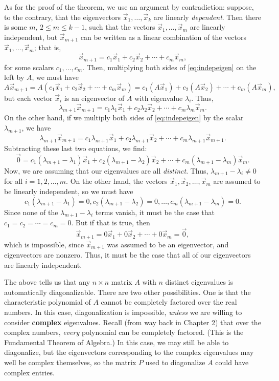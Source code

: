 As for the proof of the theorem, we use an argument by contradiction: suppose, to the contrary, that the eigenvectors $\vec{x}_1, \ldots, \vec{x}_k$ are linearly \textit{dependent}. Then there is some $m$, $2\leq m\leq k-1$, such that the vectors $\vec{x}_1, \ldots, \vec{x}_m$ are linearly independent, but $\vec{x}_{m+1}$ can be written as a linear combination of the vectors $\vec{x}_1, \ldots, \vec{x}_m$; that is,
\begin{equation}\label{eq:indepeigen}
 \vec{x}_{m+1} = c_1\vec{x}_1+c_2\vec{x}_2+\cdots + c_m\vec{x}_m,
\end{equation}
for some scalars $c_1,\ldots, c_m$. Then, multiplying both sides of \eqref{eq:indepeigen} on the left by $A$, we must have
\[
 A\vec{x}_{m+1} = A(c_1\vec{x}_1+c_2\vec{x}_2+\cdots + c_m\vec{x}_m) = c_1(A\vec{x}_1)+c_2(A\vec{x}_2)+\cdots + c_m(A\vec{x}_m),
\]
but each vector $\vec{x}_i$ is an eigenvector of $A$ with eigenvalue $\lambda_i$. Thus,
\[
 \lambda_{m+1}\vec{x}_{m+1} = c_1\lambda_1\vec{x}_1+c_2\lambda_2\vec{x}_2+\cdots + c_m\lambda_m\vec{x}_m.
\]
On the other hand, if we multiply both sides of \eqref{eq:indepeigen} by the scalar $\lambda_{m+1}$, we have
\[
 \lambda_{m+1}\vec{x}_{m+1} = c_1\lambda_{m+1}\vec{x}_1 + c_2\lambda_{m+1}\vec{x}_2 + \cdots + c_m\lambda_{m+1}\vec{x}_{m+1}.
\]
Subtracting these last two equations, we find:
\[
 \vec{0} = c_1(\lambda_{m+1}-\lambda_1)\vec{x}_1 + c_2(\lambda_{m+1}-\lambda_2)\vec{x}_2+\cdots + c_m(\lambda_{m+1}-\lambda_m)\vec{x}_m.
\]
Now, we are assuming that our eigenvalues are all \textit{distinct}. Thus, $\lambda_{m+1}-\lambda_i\neq 0$ for all $i=1,2,\ldots, m$. On the other hand, the vectors $\vec{x}_1,\vec{x}_2, \ldots, \vec{x}_m$ are assumed to be linearly independent, so we must have
\[
 c_1(\lambda_{m+1}-\lambda_1) = 0, c_2(\lambda_{m+1}-\lambda_2)=0, \ldots, c_m(\lambda_{m+1}-\lambda_m)=0.
\]
Since none of the $\lambda_{m+1}-\lambda_i$ terms vanish, it must be the case that $c_1=c_2=\cdots =c_m=0$. But if that is true, then
\[
 \vec{x}_{m+1} = 0\vec{x}_1+0\vec{x}_2+\cdots + 0\vec{x}_m = \vec{0},
\]
which is impossible, since $\vec{x}_{m+1}$ was assumed to be an eigenvector, and eigenvectors are nonzero. Thus, it must be the case that all of our eigenvectors are linearly independent.

\medskip

The above tells us that any $n\times n$ matrix $A$ with $n$ distinct eigenvalues is automatically diagonalizable. There are two other possibilities. One is that the characteristic polynomial of $A$ cannot be completely factored over the real numbers. In this case, diagonalization is impossible, \textit{unless} we are willing to consider \textbf{complex} eigenvalues. Recall (from way back in Chapter 2) that over the complex numbers, \textit{every} polynomial can be completely factored. (This is the Fundamental Theorem of Algebra.) In this case, we may still be able to diagonalize, but the eigenvectors corresponding to the complex eigenvalues may well be complex themselves, so the matrix $P$ used to diagonalize $A$ could have complex entries.

